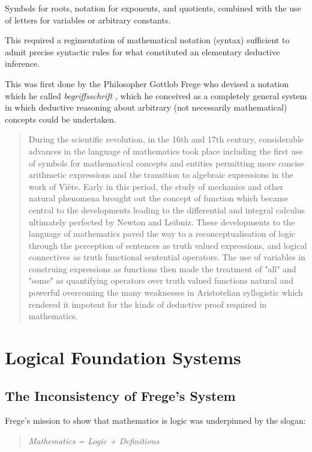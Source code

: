 \documentclass[10pt,titlepage]{book}
\begin{document}
Symbols for roots, notation for exponents, and quotients, combined with the use of letters for variables or arbitrary constants. 


This required a regimentation of mathematical notation (syntax) sufficient to admit precise syntactic rules for what constituted an elementary deductive inference.

This was first done by the Philosopher Gottlob Frege who devised a notation which he called \emph{begriffsschrift} \cite{Frege79}, which he conceived as a completely general system in which deductive reasoning about arbitrary (not necessarily mathematical) concepts could be undertaken.

\begin{quote}
  During the scientific revolution, in the 16th and 17th century, considerable advances in the language of mathematics took place including the first use of symbols for mathematical concepts and entities permitting more concise arithmetic expressions and the transition to algebraic expressions in the work of Viète.
  Early in this period, the study of mechanics and other natural phenomena brought out the concept of function which became central to the developments leading to the differential and integral calculus ultimately perfected by Newton and Leibniz.
  These developments to the language of mathematics paved the way to a reconceptualisation of logic through the perception of sentences as truth valued expressions, and logical connectives as truth functional sentential operators.
  The use of variables in construing expressions as functions then made the treatment of "all" and "some" as quantifying operators over truth valued functions natural and powerful overcoming the many weaknesses in Aristotelian syllogistic which rendered it impotent for the kinds of deductive proof required in mathematics.
\end{quote}

\chapter{Logical Foundation Systems}\label{ChapLFS}

\section{The Inconsistency of Frege's System}

Frege's mission to show that mathematics is logic was underpinned by the slogan:

\begin{quote}
{\it Mathematics = Logic + Definitions}
\end{quote}
\end{document}
